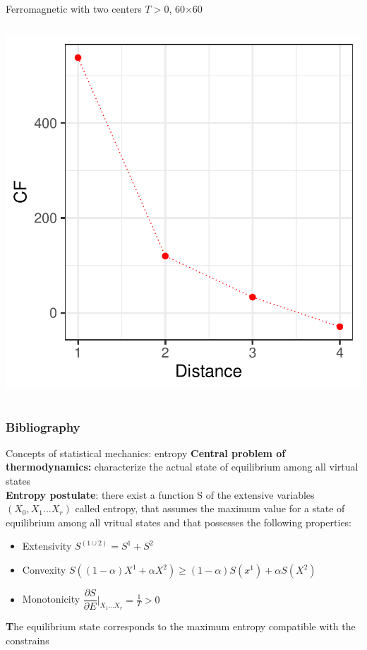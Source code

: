 \documentclass{beamer}
\begin{document}
\begin{frame}{Ferromagnetic with two centers $T>0$,  60$\times$60}
\begin{columns}
\begin{column}{0.3\textwidth}
\begin{center}
     \end{center}
         \begin{center}
     \includegraphics[width=\textwidth]{Pic/J+1_60_10000_T=8_COHERENCE.pdf}
     \end{center}
\end{column}
\end{columns}
\end{frame}








\begin{frame}[t,allowframebreaks]
\frametitle{Bibliography}
\printbibliography
\end{frame}

\begin{frame}{Concepts of statistical mechanics: entropy \cite{peliti2011statistical}}
\textbf{Central problem of thermodynamics:} characterize the actual state of equilibrium among all virtual states  \\
\textbf{Entropy postulate}: there exist a function S of the extensive variables $(X_{0},X_{1}...X_{r})$ called entropy,  that assumes the maximum value for a state of equilibrium among all vritual states and that possesses the following properties:
\begin{itemize}
\item Extensivity $S^{(1\cup2)}=S^{1}+S^{2}$
\item Convexity $S((1-\alpha)X^{1}+\alpha X^{2}) \geq (1-\alpha)S(x^{1})+\alpha S(X^{2})$
\item Monotonicity $\dfrac{\partial S}{\partial E}|_{X_{1}...X_{r}}=\frac{1}{T}>0$
\end{itemize}
\textbf The equilibrium state corresponds to the maximum entropy compatible with the constrains

\end{frame}
\end{document}
